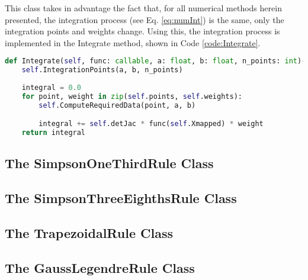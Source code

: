 This class takes in advantage the fact that, for all numerical methods herein presented, the integration process (see Eq. \eqref{eq:numInt}) is the same, only the integration points and weights change. Using this, the integration process is implemented in the Integrate method, shown in Code \ref{code:Integrate}.
\begin{lstlisting}[language=python, caption={Integrate Method.}, label={code:Integrate}]
def Integrate(self, func: callable, a: float, b: float, n_points: int)->float:
    self.IntegrationPoints(a, b, n_points)
    
    integral = 0.0
    for point, weight in zip(self.points, self.weights):
        self.ComputeRequiredData(point, a, b)

        integral += self.detJac * func(self.Xmapped) * weight 
    return integral
\end{lstlisting}

\subsection{The SimpsonOneThirdRule Class}

\subsection{The SimpsonThreeEighthsRule Class}

\subsection{The TrapezoidalRule Class}

\subsection{The GaussLegendreRule Class}